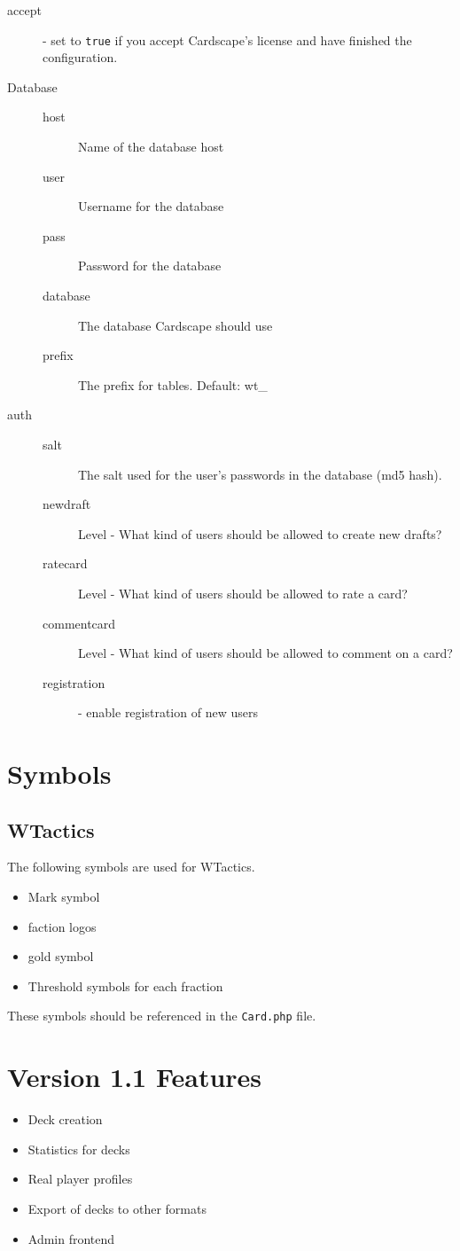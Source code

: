 \documentclass[a4paper, 11pt]{scrbook}
\begin{document}
\begin{description}
 \item[accept] \boolval - set to \texttt{true} if you accept Cardscape's license and have finished the configuration.
 \item[Database]
  \begin{description}
   \item[host] Name of the database host
   \item[user] Username for the database
   \item[pass] Password for the database
   \item[database] The database Cardscape should use
   \item[prefix] The prefix for tables. Default: wt\_
  \end{description}
 
 \item[auth]
  \begin{description}
   \item[salt] The salt used for the user's passwords in the database (md5 hash).
   \item[newdraft] Level - What kind of users should be allowed to create new drafts?
   \item[ratecard] Level - What kind of users should be allowed to rate a card?
   \item[commentcard] Level - What kind of users should be allowed to comment on a card?
   \item[registration] \boolval - enable registration of new users 
  \end{description} %

\end{description}

\chapter{Symbols}
\section{WTactics}
The following symbols are used for WTactics.
\begin{itemize}
 \item Mark symbol
 \item faction logos
 \item gold symbol
 \item Threshold symbols for each fraction
\end{itemize}
These symbols should be referenced in the \texttt{Card.php} file.

\chapter{Version 1.1 Features}
\begin{itemize}
 \item Deck creation
 \item Statistics for decks
 \item Real player profiles
 \item Export of decks to other formats
 \item Admin frontend
\end{itemize}
\end{document}

